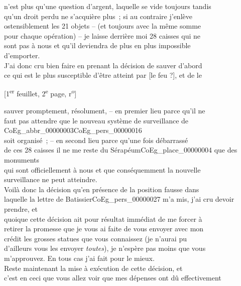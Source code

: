 \documentclass{book}
\begin{document}
n’est plus qu’une question d’argent, laquelle se vide toujours tandis\\
qu’un droit perdu ne s’acquière plus~; si au contraire j’enlève\\
ostensiblement les 21 objets – (et toujours avec la même somme\\
pour chaque opération) – je laisse derrière moi 28 caisses qui ne\\
sont pas à nous et qu’il deviendra de plus en plus impossible\\
d’emporter.\\
\indent J’ai donc cru bien faire en prenant la décision de sauver d’abord\\
ce qui est le plus susceptible d’être atteint par {[le feu ?]}, et de le
{\footnotesize\begin{center} {[1\textsuperscript{er} feuillet, 2\textsuperscript{e} page, r\textsuperscript{o}]}\end{center}}
\noindent sauver promptement, résolument, – en premier lieu parce qu’il ne\\
faut pas attendre que le nouveau système de surveillance de \gls{CoEg_abbr_00000003}\gls{CoEg_pers_00000016}\\
soit organisé~; – en second lieu parce qu’une fois débarrassé\\
de ces 28 caisses il ne me reste du Sérapéum\gls{CoEg_place_00000004} que des monuments\\
qui sont officiellement à nous et que conséquemment la nouvelle\\
surveillance ne peut atteindre.\\
\indent Voilà donc la décision qu’en présence de la position fausse dans\\
laquelle la lettre de Batissier\gls{CoEg_pers_00000027} m’a mis, j’ai cru devoir prendre, et\\
quoique cette décision ait pour résultat immédiat de me forcer à\\
retirer la promesse que je vous ai faite de vous envoyer avec mon\\
crédit les grosses statues que vous connaissez (je n’aurai pu\\
d’ailleurs vous les envoyer \textit{toutes}), je n’espère pas moins que vous\\
m’approuvez. En tous cas j’ai fait pour le mieux.\\
\indent Reste maintenant la mise à exécution de cette décision, et\\
c’est en ceci que vous allez voir que mes dépenses ont dû effectivement\\
\end{document}
